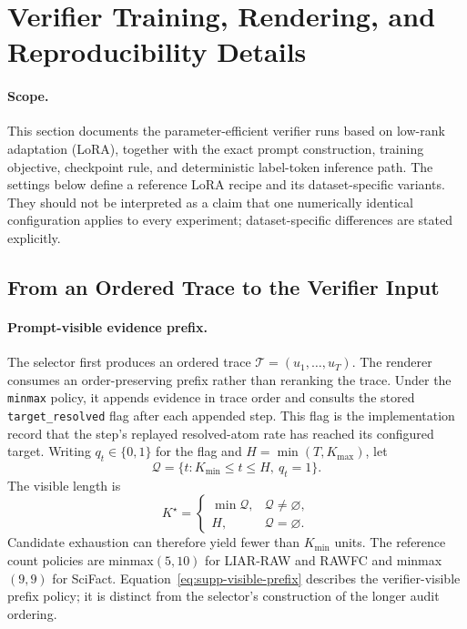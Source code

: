 \providecommand{\todovalue}{\textbf{[TODO--AUTHOR]}}
\providecommand{\todoauthor}{\textbf{TODO--AUTHOR:}}

\section{Verifier Training, Rendering, and Reproducibility Details}
\label{sec:supp-verifier}

\paragraph{Scope.}
This section documents the parameter-efficient verifier runs based on
low-rank adaptation (LoRA), together with the exact prompt construction,
training objective, checkpoint rule, and deterministic label-token
inference path.  The settings below define a reference LoRA recipe and its
dataset-specific variants.  They should not be interpreted as a claim that
one numerically identical configuration applies to every experiment;
dataset-specific differences are stated explicitly.

\subsection{From an Ordered Trace to the Verifier Input}
\label{sec:supp-verifier-renderer}

\paragraph{Prompt-visible evidence prefix.}
The selector first produces an ordered trace
$\mathcal{T}=(u_1,\ldots,u_T)$.  The renderer consumes an
order-preserving prefix rather than reranking the trace.  Under the
\texttt{minmax} policy, it appends evidence in trace order and consults the
stored \texttt{target\_resolved} flag after each appended step.  This flag is
the implementation record that the step's replayed resolved-atom rate has
reached its configured target.  Writing $q_t\in\{0,1\}$ for the flag and
$H=\min(T,K_{\max})$, let
\[
\mathcal Q=\{t:K_{\min}\leq t\leq H,\ q_t=1\}.
\]
The visible length is
\begin{equation}
K^\star =
\begin{cases}
\min\mathcal Q,&\mathcal Q\neq\varnothing,\\
H,&\mathcal Q=\varnothing.
\end{cases}
\label{eq:supp-visible-prefix}
\end{equation}
Candidate exhaustion can therefore yield fewer than $K_{\min}$ units.
The reference count policies are minmax$(5,10)$ for LIAR-RAW and RAWFC
and minmax$(9,9)$ for SciFact.  Equation~\ref{eq:supp-visible-prefix}
describes the verifier-visible prefix policy; it is distinct from the
selector's construction of the longer audit ordering.

